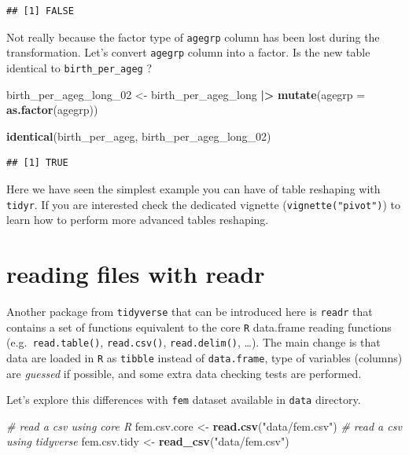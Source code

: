 \documentclass[
]{book}
\newenvironment{Shaded}{\begin{snugshade}}{\end{snugshade}}
\newcommand{\AttributeTok}[1]{\textcolor[rgb]{0.13,0.29,0.53}{#1}}
\newcommand{\CommentTok}[1]{\textcolor[rgb]{0.56,0.35,0.01}{\textit{#1}}}
\newcommand{\FunctionTok}[1]{\textcolor[rgb]{0.13,0.29,0.53}{\textbf{#1}}}
\newcommand{\NormalTok}[1]{#1}
\newcommand{\OtherTok}[1]{\textcolor[rgb]{0.56,0.35,0.01}{#1}}
\newcommand{\SpecialCharTok}[1]{\textcolor[rgb]{0.81,0.36,0.00}{\textbf{#1}}}
\newcommand{\StringTok}[1]{\textcolor[rgb]{0.31,0.60,0.02}{#1}}
\begin{document}
\begin{verbatim}
## [1] FALSE
\end{verbatim}

Not really because the factor type of \texttt{agegrp} column has been lost during the transformation.
Let's convert \texttt{agegrp} column into a factor. Is the new table identical to \texttt{birth\_per\_ageg} ?

\begin{Shaded}
\begin{Highlighting}[]
\NormalTok{birth\_per\_ageg\_long\_02 }\OtherTok{\textless{}{-}}
\NormalTok{  birth\_per\_ageg\_long }\SpecialCharTok{|\textgreater{}}
  \FunctionTok{mutate}\NormalTok{(}\AttributeTok{agegrp =} \FunctionTok{as.factor}\NormalTok{(agegrp))}

\FunctionTok{identical}\NormalTok{(birth\_per\_ageg, birth\_per\_ageg\_long\_02)}
\end{Highlighting}
\end{Shaded}

\begin{verbatim}
## [1] TRUE
\end{verbatim}

Here we have seen the simplest example you can have of table reshaping with \texttt{tidyr}. If you are interested check the dedicated vignette (\texttt{vignette("pivot")}) to learn how to perform more advanced tables reshaping.

\section{reading files with readr}\label{reading-files-with-readr}

Another package from \texttt{tidyverse} that can be introduced here is \texttt{readr} that contains a set of functions equivalent to the core \texttt{R} data.frame reading functions (e.g.~\texttt{read.table()}, \texttt{read.csv()}, \texttt{read.delim()}, \ldots). The main change is that data are loaded in \texttt{R} as \texttt{tibble} instead of \texttt{data.frame}, type of variables (columns) are \emph{guessed} if possible, and some extra data checking tests are performed.

Let's explore this differences with \texttt{fem} dataset available in \texttt{data} directory.

\begin{Shaded}
\begin{Highlighting}[]
\CommentTok{\# read a csv using core R}
\NormalTok{fem.csv.core }\OtherTok{\textless{}{-}} \FunctionTok{read.csv}\NormalTok{(}\StringTok{"data/fem.csv"}\NormalTok{)}
\CommentTok{\# read a csv using tidyverse}
\NormalTok{fem.csv.tidy }\OtherTok{\textless{}{-}} \FunctionTok{read\_csv}\NormalTok{(}\StringTok{"data/fem.csv"}\NormalTok{)}
\end{Highlighting}
\end{Shaded}
\end{document}
